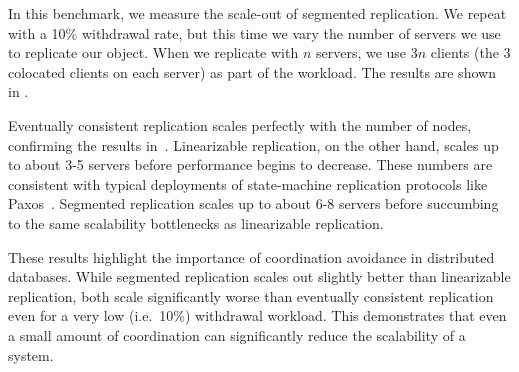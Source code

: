 \begin{benchmark}
  In this benchmark, we measure the scale-out of segmented \invariantconfluent{}
  replication. We repeat  with a 10\% withdrawal rate,
  but this time we vary the number of servers we use to replicate our object.
  When we replicate with $n$ servers, we use $3n$ clients (the $3$ colocated
  clients on each server) as part of the workload. The results are shown in
  .

  Eventually consistent replication scales perfectly with the number of nodes,
  confirming the results in~\cite{bailis2014coordination}.
  Linearizable replication, on the other hand, scales up to about 3-5 servers
  before performance begins to decrease. These numbers are consistent with
  typical deployments of state-machine replication protocols like
  Paxos~\cite{chandra2007paxos}.
  Segmented \invariantconfluent{} replication scales up to about 6-8 servers
  before succumbing to the same scalability bottlenecks as linearizable
  replication.

  These results highlight the importance of coordination avoidance in
  distributed databases. While segmented \invariantconfluent{} replication scales
  out slightly better than linearizable replication, both scale significantly
  worse than eventually consistent replication even for a very low (i.e.\ 10\%)
  withdrawal workload. This demonstrates that even a small amount of
  coordination can significantly reduce the scalability of a system.
\end{benchmark}
